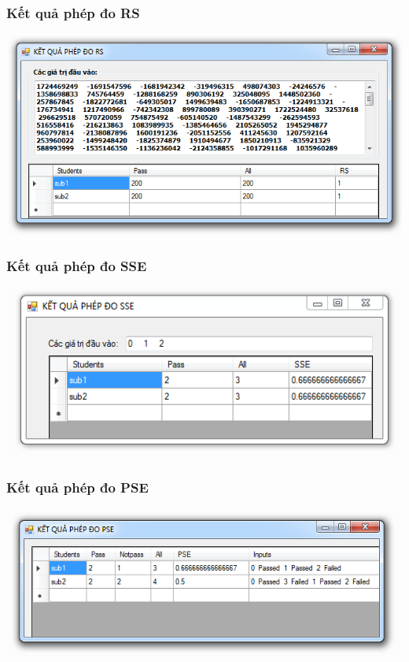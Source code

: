 \documentclass{beamer}
\begin{document}
\begin{frame}
\frametitle{Kết quả phép đo RS}
\centering
\includegraphics[width=0.8\linewidth]{images/kq_rs.png}
\end{frame}

\begin{frame}
\frametitle{Kết quả phép đo SSE}
\centering
\includegraphics[width=0.8\linewidth]{images/kq_sse.png} 
\end{frame}

\begin{frame}
\frametitle{Kết quả phép đo PSE}
\centering
\includegraphics[width=0.8\linewidth]{images/kq_pse.png}
\end{frame}
\end{document}
